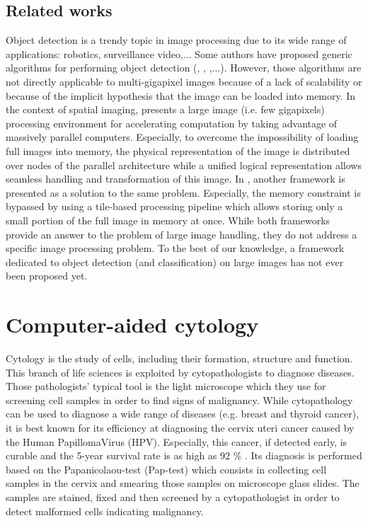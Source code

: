 \subsection{Related works}
Object detection is a trendy topic in image processing due to its wide range of applications: robotics, surveillance video,...  Some authors have proposed generic algorithms for performing object detection (\cite{lecun2004learning}, \cite{opelt2006generic}, \cite{wang2013regionlets},...). However, those algorithms are not directly applicable to multi-gigapixel images because of a lack of scalability or because of the implicit hypothesis that the image can be loaded into memory. In the context of spatial imaging, \cite{jones2003gigapixel} presents a large image (i.e. few gigapixels) processing environment for accelerating computation by taking advantage of massively parallel computers. Especially, to overcome the impossibility of loading full images into memory, the physical representation of the image is distributed over nodes of the parallel architecture while a unified logical representation allows seamless handling and transformation of this image. In \cite{powell2010scalable}, another framework is presented as a solution to the same problem. Especially, the memory constraint is bypassed by using a tile-based processing pipeline which allows storing only a small portion of the full image in memory at once. While both frameworks provide an answer to the problem of large image handling, they do not address a specific image processing problem. To the best of our knowledge, a framework dedicated to object detection (and classification) on large images has not ever been proposed yet.

\section{Computer-aided cytology}
\label{sec:cadc}
Cytology is the study of cells, including their formation, structure and function. This branch of life sciences is exploited by cytopathologists to diagnose diseases. Those pathologists' typical tool is the light microscope which they use for screening cell samples in order to find signs of malignancy. While cytopathology can be used to diagnose a wide range of diseases (e.g. breast and thyroid cancer), it is best known for its efficiency at diagnosing the cervix uteri cancer caused by the Human PapillomaVirus (HPV). Especially, this cancer, if detected early, is curable and the 5-year survival rate is as high as 92 \% \cite{bengtsson2014screening}. Its diagnosis is performed based on the Papanicolaou-test (Pap-test) which consists in collecting cell samples in the cervix and smearing those samples on microscope glass slides. The samples are stained, fixed and then screened by a cytopathologist in order to detect malformed cells indicating malignancy. 

